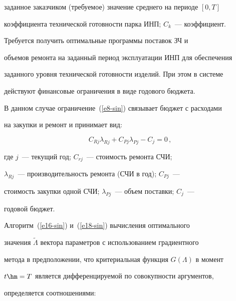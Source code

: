 заданное заказчиком (требуемое) значение среднего на периоде $[0, T]$

коэффициента технической готовности парка ИНП; $C_k$~--- коэффициент.



     Требуется получить оптимальные программы поставок ЗЧ и

объемов ремонта на заданный период эксплуатации ИНП для обеспечения

заданного уровня технической готовности изделий. При этом в системе

действуют финансовые ограничения в виде годового бюджета.



     В данном случае ограничение~(\ref{e8-sin}) связывает бюджет с расходами

на закупки и ремонт и принимает вид:

     \begin{equation*}

     C_{Rj} \lambda_{Rj}+C_{Pj}\lambda_{Pj} -C_j=0\,,


     \end{equation*}

    где $j$~--- текущий год; $C_{rj}$~--- стоимость ремонта СЧИ;

$\lambda_{Rj}$~--- производительность ремонта (СЧИ в год); $C_{Pj}$~---

стоимость закупки одной СЧИ; $\lambda_{Pj}$~--- объем поставки; $C_j$~---

годовой бюджет.



     Алгоритм~(\ref{e16-sin}) и~(\ref{e18-sin}) вычисления оптимального

значения $\tilde{\Lambda}$ вектора па\-ра\-мет\-ров с использованием градиентного

метода в предположении, что критериальная функция $G(\Lambda)$ в момент

$t\hm=T$ является дифференцируемой по совокупности аргументов,

определяется соотношениями:

